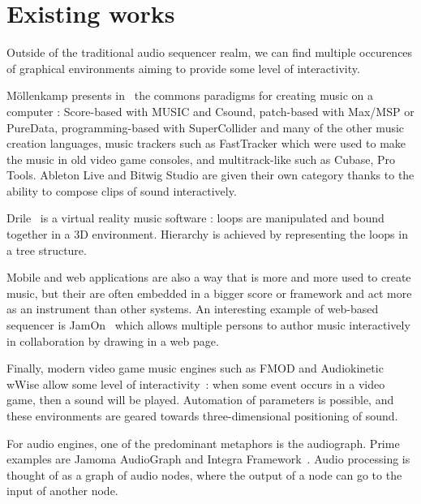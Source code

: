 \documentclass{article}
\begin{document}


\section{Existing works}
Outside of the traditional audio sequencer realm, we can find 
multiple occurences of graphical environments aiming to provide 
some level of interactivity.

M{\"o}llenkamp presents in~\cite{mollenkampparadigms} the 
commons paradigms for creating music on a computer : Score-based with MUSIC and Csound, 
patch-based with Max/MSP or PureData, programming-based with SuperCollider and many of the other music creation languages, music trackers such as FastTracker which were used to make the music in old video game consoles, and multitrack-like such as Cubase, Pro Tools.
Ableton Live and Bitwig Studio are given their own category thanks to the ability to compose clips of sound interactively.

Drile~\cite{berthaut2010drile} is a virtual reality music software : loops are manipulated and bound together in a 3D environment. Hierarchy is achieved by representing the loops in a tree structure.

Mobile and web applications are also a way that is more and more used to create music, 
but their are often embedded in a bigger score or framework and act more as an instrument than other systems.
An interesting example of web-based sequencer is JamOn~\cite{rosselet2013jam} which allows multiple persons to author music interactively in collaboration by drawing in a web page.

Finally, modern video game music engines such as FMOD and Audiokinetic wWise allow some level of interactivity~: when some event occurs in a video game, then a sound will be played. 
Automation of parameters is possible, and these environments are geared towards three-dimensional positioning of sound.

For audio engines, one of the predominant metaphors is the audiograph.
Prime examples are Jamoma AudioGraph\cite{place2010jamoma} and Integra Framework~\cite{bullock2011integra}.
Audio processing is thought of as a graph of audio nodes, where the output of a node can go to the input of another node.
\end{document}
